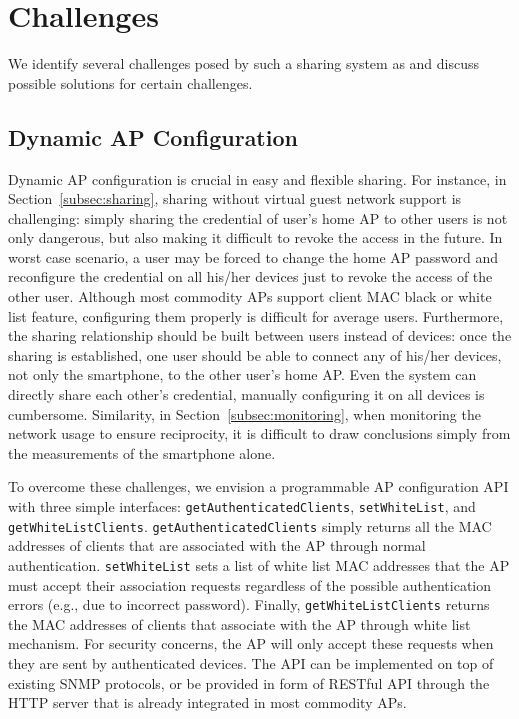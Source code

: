 \section{Challenges}
\label{sec:challenges}

We identify several challenges posed by such a \wifi{} sharing system as
\wisefi{} and discuss possible solutions for certain challenges.

\subsection{Dynamic AP Configuration}
\label{subsec:config}

Dynamic AP configuration is crucial in easy and flexible \wifi{} sharing. For
instance, in Section~\ref{subsec:sharing}, \wifi{} sharing without virtual guest
network support is challenging: simply sharing the \wifi{} credential of user's
home AP to other \wisefi{} users is not only dangerous, but also making it
difficult to revoke the access in the future. In worst case scenario, a user may
be forced to change the home AP password and reconfigure the \wifi{} credential
on all his/her devices just to revoke the access of the other \wisefi{} user.
Although most commodity APs support client MAC black or white list feature,
configuring them properly is difficult for average users. Furthermore, the
sharing relationship should be built between users instead of devices: once the
sharing is established, one user should be able to connect any of his/her
devices, not only the smartphone, to the other user's home AP. Even the system
can directly share each other's \wifi{} credential, manually configuring it on
all devices is cumbersome. Similarity, in Section~\ref{subsec:monitoring}, when
monitoring the network usage to ensure reciprocity, it is difficult to draw
conclusions simply from the measurements of the smartphone alone.

To overcome these challenges, we envision a programmable \wifi{} AP
configuration API with three simple interfaces:
\texttt{getAuthenticatedClients}, \texttt{setWhiteList}, and
\texttt{getWhiteListClients}. \texttt{getAuthenticatedClients} simply returns
all the MAC addresses of clients that are associated with the AP through normal
authentication. \texttt{setWhiteList} sets a list of white list MAC
addresses that the AP must accept their association requests regardless of the
possible authentication errors (e.g., due to incorrect \wifi{} password).
Finally, \texttt{getWhiteListClients} returns the MAC addresses of clients that
associate with the AP through white list mechanism. For
security concerns, the AP will only accept these requests when they are sent by
authenticated devices. The API can be implemented on top of
existing SNMP protocols, or be provided in form of RESTful API through the HTTP
server that is already integrated in most commodity APs.

